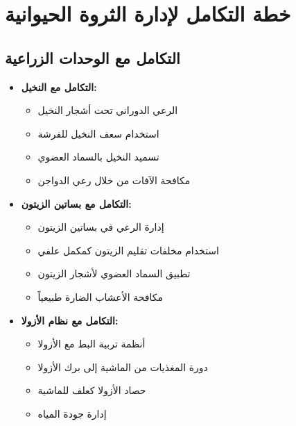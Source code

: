 \section{خطة التكامل لإدارة الثروة الحيوانية}

\subsection{التكامل مع الوحدات الزراعية}
\begin{itemize}
    \item \textbf{التكامل مع النخيل:}
    \begin{itemize}
        \item الرعي الدوراني تحت أشجار النخيل
        \item استخدام سعف النخيل للفرشة
        \item تسميد النخيل بالسماد العضوي
        \item مكافحة الآفات من خلال رعي الدواجن
    \end{itemize}
    
    \item \textbf{التكامل مع بساتين الزيتون:}
    \begin{itemize}
        \item إدارة الرعي في بساتين الزيتون
        \item استخدام مخلفات تقليم الزيتون كمكمل علفي
        \item تطبيق السماد العضوي لأشجار الزيتون
        \item مكافحة الأعشاب الضارة طبيعياً
    \end{itemize}
    
    \item \textbf{التكامل مع نظام الأزولا:}
    \begin{itemize}
        \item أنظمة تربية البط مع الأزولا
        \item دورة المغذيات من الماشية إلى برك الأزولا
        \item حصاد الأزولا كعلف للماشية
        \item إدارة جودة المياه
    \end{itemize}
\end{itemize}

